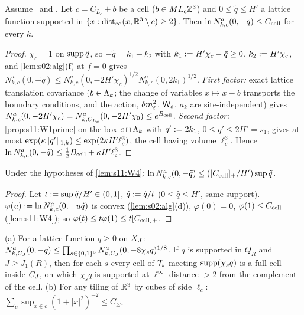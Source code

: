 \begin{lemma}\label{lem:s11:W4}
Assume \Itwo\ and \Ithree. Let $c=C_{L_c}+b$ be a cell ($b\in ML_c\mathbb Z^3$) and $0\le\tilde q\le H'$ a lattice function supported in $\{x:\operatorname{dist}_\infty(x,\mathbb R^3\setminus c)\ge2\}$. Then $\ln N^a_{k,c}(0,-\tilde q)\le C_{\rm cell}$ for every $k$.
\end{lemma}

\begin{proof}
$\chi_c=1$ on $\operatorname{supp}\tilde q$, so $-\tilde q=k_1-k_2$ with $k_1:= H'\chi_c-\tilde q\ge0$, $k_2:= H'\chi_c$, and \cref{lem:s02:alg}(f) at $f=0$ gives $N^a_{k,c}(0,-\tilde q)\le N^a_{k,c}(0,-2H'\chi_c)^{1/2}N^a_{k,c}(0,2k_1)^{1/2}$. \emph{First factor:} exact lattice translation covariance ($b\in\Lambda_k$; the change of variables $x\mapsto x-b$ transports the boundary conditions, and the action, $\delta m^2_{\varepsilon}$, $\mathsf W_{\varepsilon}$, $a_k$ are site-independent) gives $N^a_{k,c}(0,-2H'\chi_c)=N^a_{k,C_{L_c}}(0,-2H'\chi_0)\le e^{B_{\rm cell}}$. \emph{Second factor:} \cref{prop:s11:W1prime} on the box $c\cap\Lambda_k$ with $q':=2k_1$, $0\le q'\le2H'=s_1$, gives at most $\exp(\kappa\lVert q'\rVert_{1,k})\le\exp(2\kappa H'\ell_c^3)$, the cell having volume $\ell_c^3$. Hence $\ln N^a_{k,c}(0,-\tilde q)\le\frac12B_{\rm cell}+\kappa H'\ell_c^3$.
\end{proof}

\begin{lemma}\label{lem:s11:W5}
Under the hypotheses of \cref{lem:s11:W4}: $\ln N^a_{k,c}(0,-\tilde q)\le([C_{\rm cell}]_+/H')\sup\tilde q$.
\end{lemma}

\begin{proof}
Let $t:=\sup\tilde q/H'\in(0,1]$, $\hat q:=\tilde q/t$ ($0\le\hat q\le H'$, same support). $\varphi(u):=\ln N^a_{k,c}(0,-u\hat q)$ is convex (\cref{lem:s02:alg}(d)), $\varphi(0)=0$, $\varphi(1)\le C_{\rm cell}$ (\cref{lem:s11:W4}); so $\varphi(t)\le t\varphi(1)\le t[C_{\rm cell}]_+$.
\end{proof}

\begin{lemma}\label{lem:s11:W67}
\textup{(a)} For a lattice function $q\ge0$ on $X_J$: $N^a_{k,C_J}(0,-q)\le\prod_{s\in\{0,1\}^3}N^a_{k,C_J}(0,-8\chi_sq)^{1/8}$. If $q$ is supported in $Q_R$ and $J\ge J_1(R)$, then for each $s$ every cell of $\mathcal T_s$ meeting $\operatorname{supp}(\chi_sq)$ is a full cell inside $C_J$, on which $\chi_sq$ is supported at $\ell^\infty$-distance $>2$ from the complement of the cell.
\textup{(b)} For any tiling of $\mathbb R^3$ by cubes of side $\ell_c$: $\sum_c\sup_{x\in c}(1+|x|^2)^{-2}\le C_\Sigma$.
\end{lemma}

